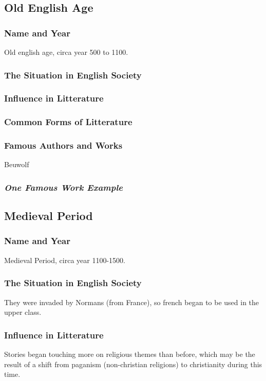 \subsection{Old English Age}

\subsubsection{Name and Year}
Old english age, circa year 500 to 1100.

\subsubsection{The Situation in English Society}


\subsubsection{Influence in Litterature}

\subsubsection{Common Forms of Litterature}

\subsubsection{Famous Authors and Works}
Beuwolf

\subsubsection{\textit{One Famous Work Example}}

\newpage
\subsection{Medieval Period}

\subsubsection{Name and Year}
Medieval Period, circa year 1100-1500.

\subsubsection{The Situation in English Society}
They were invaded by Normans (from France), so french began to be used in the upper class.

\subsubsection{Influence in Litterature}
Stories began touching more on religious themes than before, which may be the result of a shift from paganism (non-christian religions) to christianity during this time.

